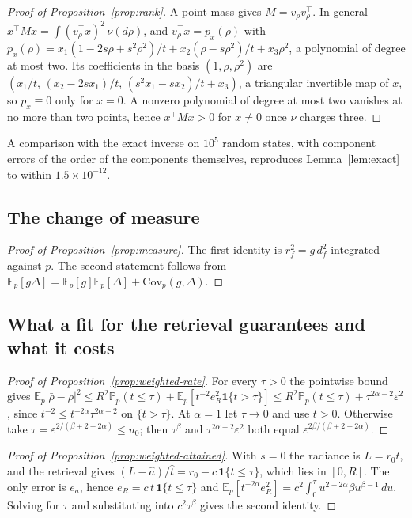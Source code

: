\documentclass[11pt]{article}
\theoremstyle{remark}
\newcommand{\E}{\mathbb{E}}
\newcommand{\Prob}{\mathbb{P}}
\newcommand{\1}{\mathbf{1}}
\begin{document}
\begin{proof}[Proof of Proposition~\ref{prop:rank}]
A point mass gives $M=v_\rho v_\rho^\top$. In general $x^\top Mx=\int(v_\rho^\top x)^2\,\nu(d\rho)$, and
$v_\rho^\top x=p_x(\rho)$ with $p_x(\rho)=x_1(1-2s\rho+s^2\rho^2)/t+x_2(\rho-s\rho^2)/t+x_3\rho^2$, a polynomial of
degree at most two. Its coefficients in the basis $(1,\rho,\rho^2)$ are $(x_1/t,\,(x_2-2sx_1)/t,\,(s^2x_1-sx_2)/t+x_3)$,
a triangular invertible map of $x$, so $p_x\equiv0$ only for $x=0$. A nonzero polynomial of degree at most two
vanishes at no more than two points, hence $x^\top Mx>0$ for $x\neq0$ once $\nu$ charges three.
\end{proof}

A comparison with the exact inverse on $10^5$ random states, with component errors of the order of the components
themselves, reproduces Lemma~\ref{lem:exact} to within $1.5\times10^{-12}$.

\subsection{The change of measure}

\begin{proof}[Proof of Proposition~\ref{prop:measure}]
The first identity is $r_f^2=g\,d_f^2$ integrated against $p$. The second statement follows from
$\E_p[g\Delta]=\E_p[g]\E_p[\Delta]+\mathrm{Cov}_p(g,\Delta)$.
\end{proof}

\subsection{What a fit for the retrieval guarantees and what it costs}

\begin{proof}[Proof of Proposition~\ref{prop:weighted-rate}]
For every $\tau>0$ the pointwise bound gives $\E_p|\bar\rho-\rho|^2\le R^2\Prob_p(t\le\tau)+\E_p[t^{-2}e_R^2\1\{t>\tau\}]
\le R^2\Prob_p(t\le\tau)+\tau^{2\alpha-2}\varepsilon^2$, since $t^{-2}\le t^{-2\alpha}\tau^{2\alpha-2}$ on $\{t>\tau\}$.
At $\alpha=1$ let $\tau\to0$ and use $t>0$. Otherwise take $\tau=\varepsilon^{2/(\beta+2-2\alpha)}\le u_0$; then
$\tau^\beta$ and $\tau^{2\alpha-2}\varepsilon^2$ both equal $\varepsilon^{2\beta/(\beta+2-2\alpha)}$.
\end{proof}

\begin{proof}[Proof of Proposition~\ref{prop:weighted-attained}]
With $s=0$ the radiance is $L=r_0t$, and the retrieval gives $(L-\hat a)/\hat t=r_0-c\,\1\{t\le\tau\}$, which lies in
$[0,R]$. The only error is $e_a$, hence $e_R=c\,t\,\1\{t\le\tau\}$ and
$\E_p[t^{-2\alpha}e_R^2]=c^2\int_0^\tau u^{2-2\alpha}\beta u^{\beta-1}\,du$. Solving for $\tau$ and substituting into
$c^2\tau^\beta$ gives the second identity.
\end{proof}
\end{document}
